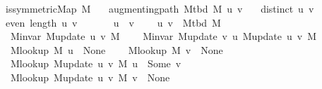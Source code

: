 \begin{isabellebody}
\ \ \ {\isachardoublequoteopen}is{\isacharunderscore}{\kern0pt}symmetric{\isacharunderscore}{\kern0pt}Map\ M{\isachardoublequoteclose}\isanewline
\ \ \ {\isachardoublequoteopen}augmenting{\isacharunderscore}{\kern0pt}path\ {\isacharparenleft}{\kern0pt}M{\isacharunderscore}{\kern0pt}tbd\ M{\isacharparenright}{\kern0pt}\ {\isacharbrackleft}{\kern0pt}u{\isacharcomma}{\kern0pt}\ v{\isacharbrackright}{\kern0pt}{\isachardoublequoteclose}\isanewline
\ \ \ {\isachardoublequoteopen}distinct\ {\isacharbrackleft}{\kern0pt}u{\isacharcomma}{\kern0pt}\ v{\isacharbrackright}{\kern0pt}{\isachardoublequoteclose}\isanewline
\ \ \ {\isachardoublequoteopen}even\ {\isacharparenleft}{\kern0pt}length\ {\isacharbrackleft}{\kern0pt}u{\isacharcomma}{\kern0pt}\ v{\isacharbrackright}{\kern0pt}{\isacharparenright}{\kern0pt}{\isachardoublequoteclose}\isanewline
\ \ \isanewline
\ \ \ \ {\isachardoublequoteopen}u\ {\isasymnoteq}\ v{\isachardoublequoteclose}\isanewline
\ \ \ \ {\isachardoublequoteopen}{\isacharbraceleft}{\kern0pt}u{\isacharcomma}{\kern0pt}\ v{\isacharbraceright}{\kern0pt}\ {\isasymnotin}\ M{\isacharunderscore}{\kern0pt}tbd\ M{\isachardoublequoteclose}\isanewline
\ \ \ \ {\isachardoublequoteopen}M{\isachardot}{\kern0pt}invar\ {\isacharparenleft}{\kern0pt}M{\isacharunderscore}{\kern0pt}update\ u\ v\ M{\isacharparenright}{\kern0pt}{\isachardoublequoteclose}\isanewline
\ \ \ \ {\isachardoublequoteopen}M{\isachardot}{\kern0pt}invar\ {\isacharparenleft}{\kern0pt}M{\isacharunderscore}{\kern0pt}update\ v\ u\ {\isacharparenleft}{\kern0pt}M{\isacharunderscore}{\kern0pt}update\ u\ v\ M{\isacharparenright}{\kern0pt}{\isacharparenright}{\kern0pt}{\isachardoublequoteclose}\isanewline
\ \ \ \ {\isachardoublequoteopen}M{\isacharunderscore}{\kern0pt}lookup\ M\ u\ {\isacharequal}{\kern0pt}\ None{\isachardoublequoteclose}\isanewline
\ \ \ \ {\isachardoublequoteopen}M{\isacharunderscore}{\kern0pt}lookup\ M\ v\ {\isacharequal}{\kern0pt}\ None{\isachardoublequoteclose}\isanewline
\ \ \ \ {\isachardoublequoteopen}M{\isacharunderscore}{\kern0pt}lookup\ {\isacharparenleft}{\kern0pt}M{\isacharunderscore}{\kern0pt}update\ u\ v\ M{\isacharparenright}{\kern0pt}\ u\ {\isacharequal}{\kern0pt}\ Some\ v{\isachardoublequoteclose}\isanewline
\ \ \ \ {\isachardoublequoteopen}M{\isacharunderscore}{\kern0pt}lookup\ {\isacharparenleft}{\kern0pt}M{\isacharunderscore}{\kern0pt}update\ u\ v\ M{\isacharparenright}{\kern0pt}\ v\ {\isacharequal}{\kern0pt}\ None{\isachardoublequoteclose}%
\endisataginvisible
{\isafoldinvisible}%

\end{isabellebody}
